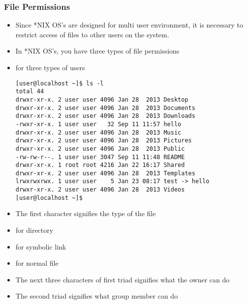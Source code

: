 \documentclass[10pt,t]{beamer}
\begin{document}
\begin{frame}
  \frametitle{File Permissions}
  \begin{itemize}
    \item Since *NIX OS's are designed for multi user environment, it is necessary to restrict access of files to other users on the system.
    \item In *NIX OS's, you have three types of file permissions
    \item for three types of users
    \begin{Verbatim}[formatcom=\color{lubrown},fontsize=\scriptsize]
[user@localhost ~]$ ls -l
total 44
drwxr-xr-x. 2 user user 4096 Jan 28  2013 Desktop
drwxr-xr-x. 2 user user 4096 Jan 28  2013 Documents
drwxr-xr-x. 2 user user 4096 Jan 28  2013 Downloads
-rwxr-xr-x. 1 user user   32 Sep 11 11:57 hello
drwxr-xr-x. 2 user user 4096 Jan 28  2013 Music
drwxr-xr-x. 2 user user 4096 Jan 28  2013 Pictures
drwxr-xr-x. 2 user user 4096 Jan 28  2013 Public
-rw-rw-r--. 1 user user 3047 Sep 11 11:48 README
drwxr-xr-x. 1 root root 4216 Jan 22 16:17 Shared
drwxr-xr-x. 2 user user 4096 Jan 28  2013 Templates
lrwxrwxrwx. 1 user user    5 Jan 23 08:17 test -> hello
drwxr-xr-x. 2 user user 4096 Jan 28  2013 Videos
[user@localhost ~]$ 
    \end{Verbatim}
    \item The first character signifies the type of the file
    \item[]  for directory
    \item[]  for symbolic link
    \item[] \Verblubrown{-} for normal file
    \item The next three characters of first triad signifies what the owner can do
    \item The second triad signifies what group member can do

\end{itemize}
\end{frame}
\end{document}
